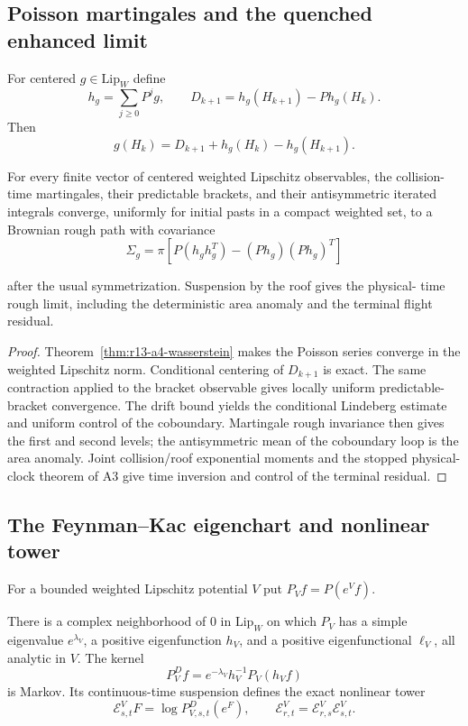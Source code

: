 \subsection{Poisson martingales and the quenched enhanced limit}

For centered $g\in\mathrm{Lip}_W$ define
\[
 h_g=\sum_{j\ge0}P^jg,
 \qquad
 D_{k+1}=h_g(H_{k+1})-Ph_g(H_k).
\]
Then
\[
 g(H_k)=D_{k+1}+h_g(H_k)-h_g(H_{k+1}).
\]

\begin{theorem}
\label{thm:r13-a4-rough}
For every finite vector of centered weighted Lipschitz observables, the
collision-time martingales, their predictable brackets, and their antisymmetric
iterated integrals converge, uniformly for initial pasts in a compact weighted
set, to a Brownian rough path with covariance
\[
 \Sigma_g=\pi\!
 \left[P(h_gh_g^T)-(Ph_g)(Ph_g)^T\right]
\]

after the usual symmetrization.  Suspension by the roof gives the physical-
time rough limit, including the deterministic area anomaly and the terminal
flight residual.
\end{theorem}

\begin{proof}
Theorem~\ref{thm:r13-a4-wasserstein} makes the Poisson series converge in the
weighted Lipschitz norm.  Conditional centering of $D_{k+1}$ is exact.  The
same contraction applied to the bracket observable gives locally uniform
predictable-bracket convergence.  The drift bound yields the conditional
Lindeberg estimate and uniform control of the coboundary.  Martingale rough
invariance then gives the first and second levels; the antisymmetric mean of
the coboundary loop is the area anomaly.  Joint collision/roof exponential
moments and the stopped physical-clock theorem of A3 give time inversion and
control of the terminal residual.
\end{proof}

\subsection{The Feynman--Kac eigenchart and nonlinear tower}

For a bounded weighted Lipschitz potential $V$ put
$P_Vf=P(e^Vf)$.

\begin{theorem}
\label{thm:r13-a4-doob}
There is a complex neighborhood of $0$ in
$\mathrm{Lip}_W$ on which $P_V$ has a simple eigenvalue $e^{\lambda_V}$,
a positive eigenfunction $h_V$, and a positive eigenfunctional $\ell_V$,
all analytic in $V$.  The kernel
\[
 P_V^Df=e^{-\lambda_V}h_V^{-1}P_V(h_Vf)
\]
is Markov.  Its continuous-time suspension defines the exact nonlinear tower
\[
 \mathcal E_{s,t}^VF
 =\log P_{V,s,t}^D(e^F),
 \qquad
 \mathcal E_{r,t}^V=\mathcal E_{r,s}^V\mathcal E_{s,t}^V.
\]
\end{theorem}

